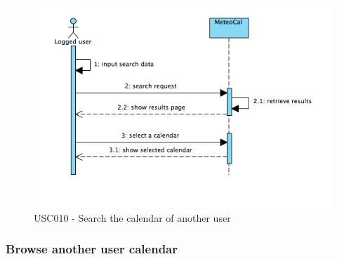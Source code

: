 \documentclass[10pt,a4paper,titlepage]{article}
\begin{document}
\begin{figure}[h]
\centering
\includegraphics[width=\linewidth]{./Sequence_diag/USC010.png}
\caption[USC010]{USC010 - Search the calendar of another user}
\label{fig:USC010}
\end{figure}

\clearpage
\subsubsection{Browse another user calendar} 
\end{document}
